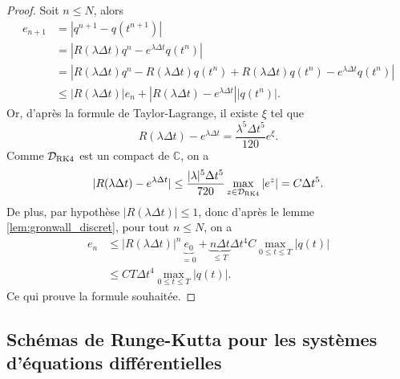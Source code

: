 \begin{proof}
Soit $n \leq N$, alors
\begin{align*}
e_{n+1} & = |q^{n+1} - q(t^{n+1})| \\
	& = |R(\lambda \Delta t) q^n - e^{\lambda \Delta t}q(t^n)| \\
	& = |R(\lambda \Delta t) q^n - R(\lambda \Delta t) q(t^n) + R(\lambda \Delta t) q(t^n)- e^{\lambda \Delta t}q(t^n)| \\
	& \leq |R(\lambda \Delta t)| e_n + |R(\lambda \Delta t) - e^{\lambda \Delta t}| |q(t^n)|.
\end{align*}
Or, d'après la formule de Taylor-Lagrange, il existe $\xi$ tel que
\begin{equation}
R(\lambda \Delta t) - e^{\lambda \Delta t} = \dfrac{\lambda^5 \Delta t^5}{120} e^{\xi}.
\end{equation}
Comme $\mathcal{D}_{\RK4}$ est un compact de $\mathbb{C}$, on a
\begin{align*}
|R(\lambda \Delta t) - e^{\lambda \Delta t}| \leq \dfrac{|\lambda|^5 \Delta t^5}{720} \max_{z \in \mathcal{D}_{\RK4}} |e^z| = C \Delta t^5.
\end{align*}
De plus, par hypothèse $|R(\lambda \Delta t)| \leq 1$, donc d'après le lemme \ref{lem:gronwall_discret}, pour tout $n \leq N$, on a
\begin{align*}
e_n & \leq |R(\lambda \Delta t)|^n \underbrace{e_0}_{=0} + \underbrace{n \Delta t}_{\leq T} \Delta t^4 C \max_{0 \leq t \leq T} |q(t)| \\
	& \leq CT \Delta t^4 \max_{0 \leq t \leq T} |q(t)|.
\end{align*}
Ce qui prouve la formule souhaitée.
\end{proof}




\subsection{Schémas de Runge-Kutta pour les systèmes d'équations différentielles}

